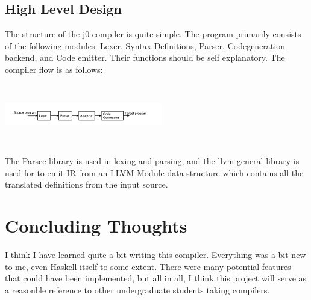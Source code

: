 \documentclass[11pt,a4paper]{article}
\begin{document}
\subsection{High Level Design}
The structure of the j0 compiler is quite simple. The program primarily consists of the following modules: Lexer, Syntax Definitions, Parser, Codegeneration backend, and Code emitter. Their functions should be self explanatory. The compiler flow is as follows: \\
\begin{center}
 \includegraphics[width=260px,height=100px,bb=0 0 919 132,keepaspectratio=true]{./flow.png}
\end{center}
The Parsec library is used in lexing and parsing, and the llvm-general library is used for to emit IR from an LLVM Module data structure which contains all the translated definitions from the input source.









\section{Concluding Thoughts}
I think I have learned quite a bit writing this compiler. Everything was a bit new to me, even Haskell itself to some extent. There were many potential features that could have been implemented, but all in all, I think this project will serve as a reasonble reference to other undergraduate students taking compilers.
\end{document}
